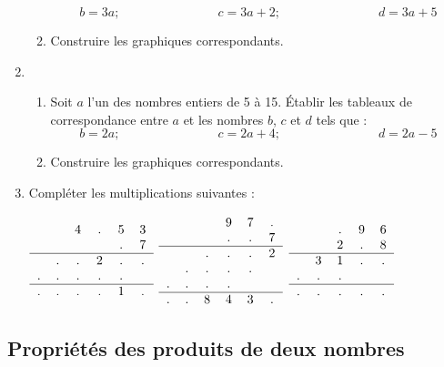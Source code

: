 \documentclass[12 pt]{extarticle}
\theoremstyle{plain}
\begin{document}
\begin{enumerate}
\begin{enumerate}
\[ b= 3 a ; \phantom{meowmeowmeow} c = 3a + 2 ;
\phantom{meowmeowmeow} d = 3a + 5\]
\item Construire les graphiques correspondants. 
\end{enumerate}
\item \begin{enumerate}
\item Soit $a$ l'un des nombres entiers de 5 à 15. 
Établir les tableaux de correspondance entre $a$ et 
les nombres $b$, $c$ et $d$ tels que : 
\[ b= 2 a ; \phantom{meowmeowmeow} c = 2a + 4 ;
\phantom{meowmeowmeow} d = 2a - 5\]
\item Construire les graphiques correspondants. 
\end{enumerate}
\item Compléter les multiplications suivantes : 

  $ \begin{tabular}{cccccc}
   & & 4 & . & 5 & 3 \\
   & &   &   & . & 7  \\
   \hline 
   & . & . & 2 & . & . \\
   . & . &. &. & . &\\
   \hline 
   . &. &. &. & 1 &. 
  \end{tabular}
 $\phantom{meowmeow}
   $ \begin{tabular}{cccccc}
   & & & 9 & 7 & .\\
   & & & . & . &  7 \\
   \hline
   & & . & . &. & 2 \\
   & . & . & . & . & \\
   . & . & . & . & & \\
   \hline 
   . & . & 8 & 4 & 3 & . 
  \end{tabular}
 $
   $ \begin{tabular}{ccccc}
   & & . & 9 & 6 \\ 
   & & 2 & . & 8 \\
   \hline 
   & 3 & 1 & . & . \\
   . & . & . & & \\ 
   \hline 
   . & . & . & . &.
  \end{tabular}
 $

 \end{enumerate}
 
 \subsection{Propriétés des produits de deux nombres}
 
\end{document}
